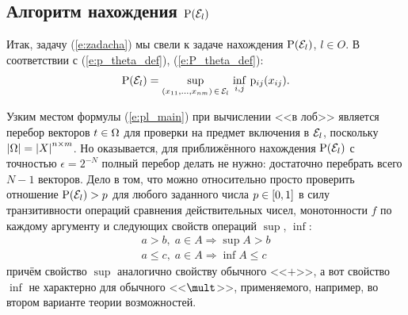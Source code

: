 \documentclass{article}
\begin{document}
\subsection{Алгоритм нахождения ${\mathrm{P}}(\mathcal{E}_l)$}
 Итак, задачу (\ref{e:zadacha}) мы свели к задаче нахождения ${\mathrm{P}}(\mathcal{E}_l)$, $l \in O$. В соответствии с (\ref{e:p_theta_def}), (\ref{e:P_theta_def}):
\begin{equation}
  \label{e:pl_main}
  {\mathrm{P}}(\mathcal{E}_l) = \sup_{(x_{11}, ..., x_{nm})\,\in\,\mathcal{E}_l} \, \inf_{i, j}\,{\mathrm{p}}_{ij}(x_{ij}). 
\end{equation}

Узким местом формулы (\ref{e:pl_main}) при вычислении <<в лоб>> является перебор векторов $t \in \Omega$ для проверки на предмет включения в $\mathcal{E}_l$, поскольку $\left| \Omega \right| = \left| X \right|^{n \times m}$. Но оказывается, для приближённого нахождения ${\mathrm{P}}(\mathcal{E}_l)$ с точностью $\epsilon = 2^{-N}$ полный перебор делать не нужно: достаточно перебрать всего $N-1$ векторов. Дело в том, что можно относительно просто проверить отношение ${\mathrm{P}}(\mathcal{E}_l) > p$ для любого заданного числа $p \in [0,1]$ в силу транзитивности операций сравнения действительных чисел, монотонности $f$ по каждому аргументу и следующих свойств операций $\sup$, $\inf$: 
\begin{gather*}
  a > b,\; a \in A \Rightarrow \sup A > b\\
  a \leq c,\; a \in A \Rightarrow \inf A \leq c
\end{gather*}
причём свойство $\sup$ аналогично свойству обычного <<$\plus$>>, а вот свойство $\inf$ не характерно для обычного <<$\mult$>>, применяемого, например, во втором варианте теории возможностей. 
\end{document}
